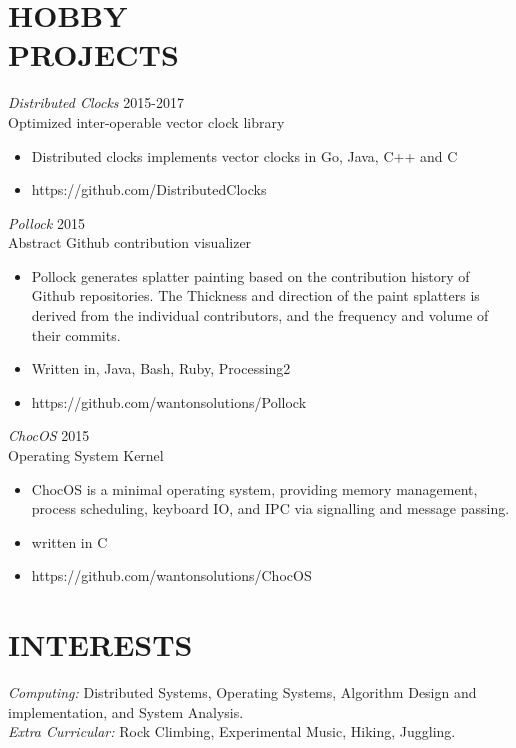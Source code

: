 \documentclass[line,margin]{res}
\begin{document}
\begin{resume}
\section{HOBBY \\ PROJECTS}
{\sl Distributed Clocks} \hfill 2015-2017\\
    Optimized inter-operable vector clock library
\begin{itemize} \itemsep -2pt
		\item Distributed clocks implements vector clocks in Go, Java, C++ and C
		\item https://github.com/DistributedClocks
\end{itemize}

{\sl Pollock} \hfill 2015\\
	Abstract Github contribution visualizer
\begin{itemize} \itemsep -2pt
		\item Pollock generates splatter painting based on the contribution history of Github repositories. The Thickness and direction of the paint splatters is derived from the individual contributors, and the frequency and volume of their commits.
		\item Written in, Java, Bash, Ruby, Processing2
		\item https://github.com/wantonsolutions/Pollock
\end{itemize}

{\sl ChocOS} \hfill 2015\\
	Operating System Kernel
\begin{itemize} \itemsep -2pt
		\item ChocOS is a minimal operating system, providing memory management, process scheduling, keyboard IO, and IPC via signalling and message passing.
		\item written in C
		\item https://github.com/wantonsolutions/ChocOS
\end{itemize}

\section{INTERESTS}
	{\sl Computing:}  Distributed Systems, Operating Systems, Algorithm Design and implementation, and System Analysis.\\
	{\sl Extra Curricular:} Rock Climbing, Experimental Music, Hiking, Juggling.\\

\end{resume}
\end{document}
